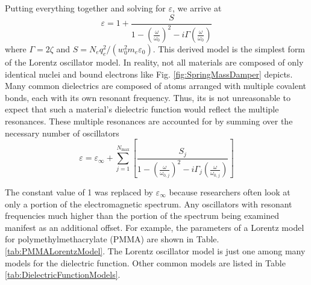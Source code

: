 Putting everything together and solving for $\varepsilon$, we arrive at
%
\begin{equation}
\varepsilon = 1 + \frac{S}{1 - \left( \frac{\omega}{\omega_{0}} \right)^{2} - i \Gamma \left( \frac{\omega}{\omega_{0}} \right)}
\end{equation}
%
where $\Gamma = 2 \zeta$ and $S = N_{e} q_{e}^{2} / (w_{0}^{2} m_{e} \varepsilon_{0})$. This derived model is the simplest form of the Lorentz oscillator model. In reality, not all materials are composed of only identical nuclei and bound electrons like Fig. \ref{fig:SpringMassDamper} depicts. Many common dielectrics are composed of atoms arranged with multiple covalent bonds, each with its own resonant frequency. Thus, its is not unreasonable to expect that such a material's dielectric function would reflect the multiple resonances. These multiple resonances are accounted for by summing over the necessary number of oscillators
%
\begin{equation}
\varepsilon = \varepsilon_{\infty} + \sum_{j=1}^{N_{\mathrm{max}}} \left[ \frac{S_{j}}{1 - \left( \frac{\omega}{\omega_{0,j}} \right)^{2} - i \Gamma_{j} \left( \frac{\omega}{\omega_{0,j}} \right)} \right]
\end{equation}

The constant value of 1 was replaced by $\varepsilon_{\infty}$ because researchers often look at only a portion of the electromagnetic spectrum. Any oscillators with resonant frequencies much higher than the portion of the spectrum being examined manifest as an additional offset. For example, the parameters of a Lorentz model for polymethylmethacrylate (PMMA) are shown in Table. \ref{tab:PMMALorentzModel}. The Lorentz oscillator model is just one among many models for the dielectric function. Other common models are listed in Table \ref{tab:DielectricFunctionModels}.

